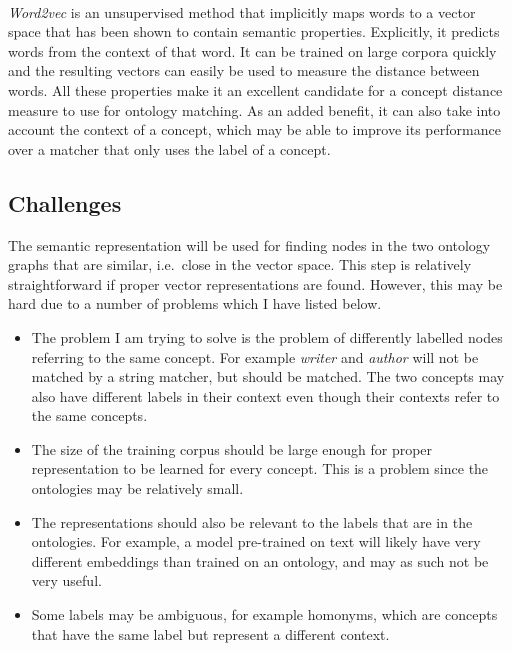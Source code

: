 \documentclass{article}
\begin{document}
 \paragraph{}
 \emph{Word2vec} is an unsupervised method that implicitly maps words to a vector space that has been shown to contain semantic properties. Explicitly, it predicts words from the context of that word\cite{w2v}.
 It can be trained on large corpora quickly and the resulting vectors can easily be used to measure the distance between words. All these properties make it an excellent candidate for a concept distance measure to use for ontology matching. As an added benefit, it can also take into account the context of a concept, which may be able to improve its performance over a matcher that only uses the label of a concept. 
 
 \subsection{Challenges}
 The semantic representation will be used for finding nodes in the two ontology graphs that are similar, i.e.\ close in the vector space. This step is relatively straightforward if proper vector representations are found. However, this may be hard due to a number of problems which I have listed below.

 \begin{itemize}
  \item The problem I am trying to solve is the problem of differently labelled nodes referring to the same concept. For example \emph{writer} and \emph{author} will not be matched by a string matcher, but should be matched. The two concepts may also have different labels in their context even though their contexts refer to the same concepts.
  \item The size of the training corpus should be large enough for proper representation to be learned for every concept. This is a problem since the ontologies may be relatively small. 
  \item The representations should also be relevant to the labels that are in the ontologies. For example, a model pre-trained on text will likely have very different embeddings than trained on an ontology, and may as such not be very useful.
  \item Some labels may be ambiguous, for example homonyms, which are concepts that have the same label but represent a different context.
 \end{itemize}
 
\end{document}
